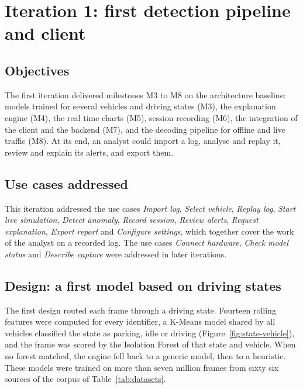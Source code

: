 \section{Iteration 1: first detection pipeline and client}
\label{sec:it1}

\subsection{Objectives}

The first iteration delivered milestones M3 to M8 on the architecture baseline: models trained for several vehicles and driving states (M3), the explanation engine (M4), the real time charts (M5), session recording (M6), the integration of the client and the backend (M7), and the decoding pipeline for offline and live traffic (M8). At its end, an analyst could import a log, analyse and replay it, review and explain its alerts, and export them.

\subsection{Use cases addressed}

This iteration addressed the use cases \emph{Import log}, \emph{Select vehicle}, \emph{Replay log}, \emph{Start live simulation}, \emph{Detect anomaly}, \emph{Record session}, \emph{Review alerts}, \emph{Request explanation}, \emph{Export report} and \emph{Configure settings}, which together cover the work of the analyst on a recorded log. The use cases \emph{Connect hardware}, \emph{Check model status} and \emph{Describe capture} were addressed in later iterations.

\subsection{Design: a first model based on driving states}
\label{sec:impl-state}

The first design routed each frame through a driving state. Fourteen rolling features were computed for every identifier, a K-Means model shared by all vehicles classified the state as parking, idle or driving (Figure~\ref{fig:state-vehicle}), and the frame was scored by the Isolation Forest of that state and vehicle. When no forest matched, the engine fell back to a generic model, then to a heuristic. These models were trained on more than seven million frames from sixty six sources of the corpus of Table~\ref{tab:datasets}.

